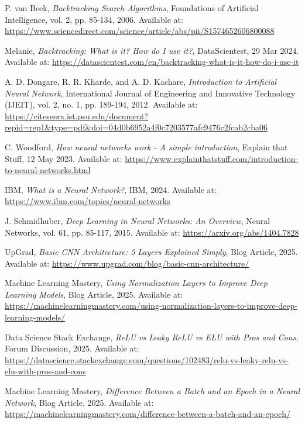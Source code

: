 \documentclass[]{final_report}
\begin{document}
\begin{thebibliography}{99}
 P. van Beek, \textit{Backtracking Search Algorithms}, Foundations of Artificial Intelligence, vol. 2, pp. 85-134, 2006. Available at: \url{https://www.sciencedirect.com/science/article/abs/pii/S1574652606800088}

 Melanie, \textit{Backtracking: What is it? How do I use it?}, DataScientest, 29 Mar 2024. Available at: \url{https://datascientest.com/en/backtracking-what-is-it-how-do-i-use-it}

 A. D. Dongare, R. R. Kharde, and A. D. Kachare, \textit{Introduction to Artificial Neural Network}, International Journal of Engineering and Innovative Technology (IJEIT), vol. 2, no. 1, pp. 189-194, 2012. Available at: \url{https://citeseerx.ist.psu.edu/document?repid=rep1&type=pdf&doi=04d0b6952a4f0c7203577afc9476c2fcab2cba06} 

 C. Woodford, \textit{How neural networks work - A simple introduction}, Explain that Stuff, 12 May 2023. Available at: \url{https://www.explainthatstuff.com/introduction-to-neural-networks.html} 

 IBM, \textit{What is a Neural Network?}, IBM, 2024. Available at: \url{https://www.ibm.com/topics/neural-networks} 

 J. Schmidhuber, \textit{Deep Learning in Neural Networks: An Overview}, Neural Networks, vol. 61, pp. 85-117, 2015. Available at: \url{https://arxiv.org/abs/1404.7828}

 UpGrad, \textit{Basic CNN Architecture: 5 Layers Explained Simply}, Blog Article, 2025. Available at: \url{https://www.upgrad.com/blog/basic-cnn-architecture/}

 Machine Learning Mastery, \textit{Using Normalization Layers to Improve Deep Learning Models}, Blog Article, 2025. Available at: \url{https://machinelearningmastery.com/using-normalization-layers-to-improve-deep-learning-models/}

 Data Science Stack Exchange, \textit{ReLU vs Leaky ReLU vs ELU with Pros and Cons}, Forum Discussion, 2025. Available at: \url{https://datascience.stackexchange.com/questions/102483/relu-vs-leaky-relu-vs-elu-with-pros-and-cons}

 Machine Learning Mastery, \textit{Difference Between a Batch and an Epoch in a Neural Network}, Blog Article, 2025. Available at: \url{https://machinelearningmastery.com/difference-between-a-batch-and-an-epoch/}


\end{thebibliography}
\end{document}
